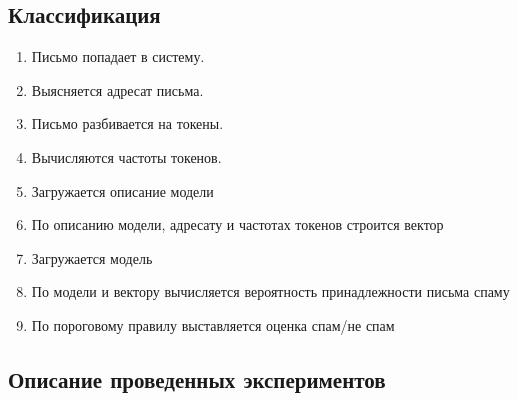 \subsection{Классификация}
\begin{enumerate}
    \item Письмо попадает в систему.
    \item Выясняется адресат письма.
    \item Письмо разбивается на токены.
    \item Вычисляются частоты токенов.
    \item Загружается описание модели
    \item По описанию модели, адресату и частотах токенов строится вектор
    \item Загружается модель
    \item По модели и вектору вычисляется вероятность принадлежности письма спаму
    \item По пороговому правилу выставляется оценка спам/не спам
\end{enumerate}

\subsection{Описание проведенных экспериментов}
